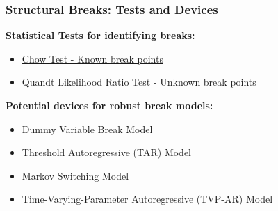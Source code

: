 \begin{frame}
\frametitle{Structural Breaks: Tests and Devices}
\textbf{Statistical Tests for identifying breaks:}
    \begin{itemize}
        \item \underline{\alert{Chow Test - Known break points}}
        \item Quandt Likelihood Ratio Test - Unknown break points
    \end{itemize}
    \vspace{10pt}
\textbf{Potential devices for robust break models:}
    \begin{itemize}
        \item \underline{\alert{Dummy Variable Break Model}}
        \item Threshold Autoregressive (TAR) Model
        \item Markov Switching Model
        \item Time-Varying-Parameter Autoregressive (TVP-AR) Model
    \end{itemize}
\end{frame}